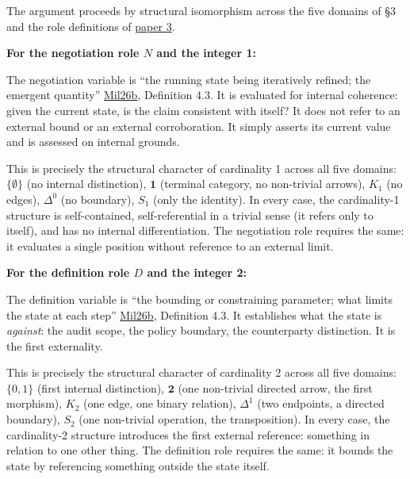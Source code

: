 \documentclass[
  11pt,
  letterpaper,
]{article}
\begin{document}
The argument proceeds by structural isomorphism across the five domains
of §3 and the role definitions of
\href{https://github.com/baardev/truevalue/blob/main/docnav/Research/papers/3_minimal-recursive-triadic-framework/3_minimal-recursive-triadic-framework.pdf}{paper
3}.

\textbf{For the negotiation role \(N\) and the integer 1:}

The negotiation variable is ``the running state being iteratively
refined; the emergent quantity''
\href{https://github.com/baardev/truevalue/blob/main/docnav/Research/papers/3_minimal-recursive-triadic-framework/3_minimal-recursive-triadic-framework.pdf}{Mil26b},
Definition 4.3. It is evaluated for internal coherence: given the
current state, is the claim consistent with itself? It does not refer to
an external bound or an external corroboration. It simply asserts its
current value and is assessed on internal grounds.

This is precisely the structural character of cardinality 1 across all
five domains: \(\{\emptyset\}\) (no internal distinction),
\(\mathbf{1}\) (terminal category, no non-trivial arrows), \(K_1\) (no
edges), \(\Delta^0\) (no boundary), \(S_1\) (only the identity). In
every case, the cardinality-1 structure is self-contained,
self-referential in a trivial sense (it refers only to itself), and has
no internal differentiation. The negotiation role requires the same: it
evaluates a single position without reference to an external limit.

\textbf{For the definition role \(D\) and the integer 2:}

The definition variable is ``the bounding or constraining parameter;
what limits the state at each step''
\href{https://github.com/baardev/truevalue/blob/main/docnav/Research/papers/3_minimal-recursive-triadic-framework/3_minimal-recursive-triadic-framework.pdf}{Mil26b},
Definition 4.3. It establishes what the state is \emph{against}: the
audit scope, the policy boundary, the counterparty distinction. It is
the first externality.

This is precisely the structural character of cardinality 2 across all
five domains: \(\{0,1\}\) (first internal distinction), \(\mathbf{2}\)
(one non-trivial directed arrow, the first morphism), \(K_2\) (one edge,
one binary relation), \(\Delta^1\) (two endpoints, a directed boundary),
\(S_2\) (one non-trivial operation, the transposition). In every case,
the cardinality-2 structure introduces the first external reference:
something in relation to one other thing. The definition role requires
the same: it bounds the state by referencing something outside the state
itself.
\end{document}
